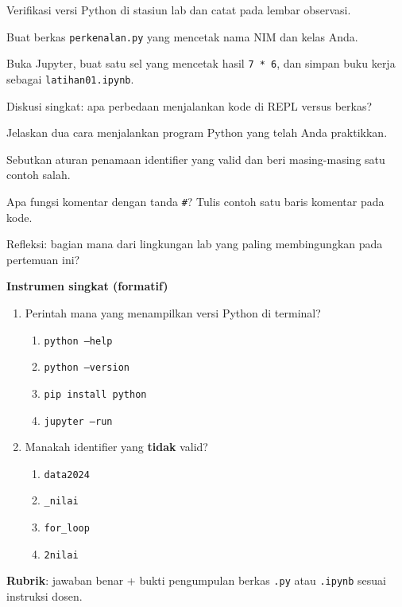 \documentclass[../main.tex]{subfiles}
\begin{document}
\begin{aktivitas}
  \item Verifikasi versi Python di stasiun lab dan catat pada lembar observasi.
  \item Buat berkas \texttt{perkenalan.py} yang mencetak nama NIM dan kelas Anda.
  \item Buka Jupyter, buat satu sel yang mencetak hasil \texttt{7 * 6}, dan simpan buku kerja sebagai \texttt{latihan01.ipynb}.
  \item Diskusi singkat: apa perbedaan menjalankan kode di REPL versus berkas?
\end{aktivitas}

\begin{latihan}
  \item Jelaskan dua cara menjalankan program Python yang telah Anda praktikkan.
  \item Sebutkan aturan penamaan identifier yang valid dan beri masing-masing satu contoh salah.
  \item Apa fungsi komentar dengan tanda \texttt{\#}? Tulis contoh satu baris komentar pada kode.
  \item Refleksi: bagian mana dari lingkungan lab yang paling membingungkan pada pertemuan ini?
\end{latihan}

\begin{asesmen}
\textbf{Instrumen singkat (formatif)}

\begin{enumerate}
  \item Perintah mana yang menampilkan versi Python di terminal?
  \begin{enumerate}
    \item \texttt{python --help}
    \item \texttt{python --version}
    \item \texttt{pip install python}
    \item \texttt{jupyter --run}
  \end{enumerate}
  \item Manakah identifier yang \textbf{tidak} valid?
  \begin{enumerate}
    \item \texttt{data2024}
    \item \texttt{\_nilai}
    \item \texttt{for\_loop}
    \item \texttt{2nilai}
  \end{enumerate}
\end{enumerate}

\textbf{Rubrik}: jawaban benar + bukti pengumpulan berkas \texttt{.py} atau \texttt{.ipynb} sesuai instruksi dosen.
\end{asesmen}
\end{document}
